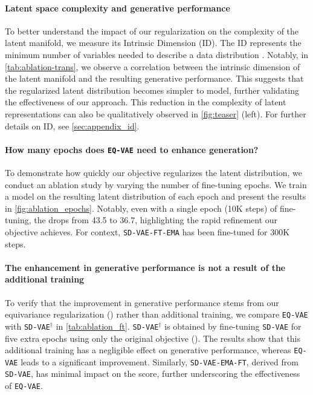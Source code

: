 


\vspace{-10pt}
\paragraph{Latent space complexity and generative performance}

To better understand the impact of our regularization on the complexity of the latent manifold, we measure its Intrinsic Dimension (ID). The ID represents the minimum number of variables needed to describe a data distribution \cite{1054365}. 
Notably, in \autoref{tab:ablation-trans}, we observe a correlation between the intrinsic dimension of the latent manifold and the resulting generative performance.
This suggests that the regularized latent distribution becomes simpler to model, further validating the effectiveness of our approach. This reduction in the complexity of latent representations can also be qualitatively observed in \autoref{fig:teaser} (left).
For further details on ID, see \autoref{sec:appendix_id}. 



\paragraph{How many epochs does \texttt{EQ-VAE} need to enhance generation?} To demonstrate how quickly our objective regularizes the latent distribution, we conduct an ablation study by varying the number of fine-tuning epochs. We train a \ditbtwo model on the resulting latent distribution of each epoch and present the results in \autoref{fig:ablation_epochs}. Notably, even with a single epoch (10K steps) of fine-tuning, the  drops from 43.5 to 36.7, highlighting the rapid refinement our objective achieves. For context, \texttt{SD-VAE-FT-EMA} has been fine-tuned for 300K steps.



\paragraph{The enhancement in generative performance is not a result of the additional training} 
To verify that the improvement in generative performance stems from our equivariance regularization () rather than additional training, we compare \texttt{EQ-VAE} with \texttt{SD-VAE}$^\dagger$ in \autoref{tab:ablation_ft}. \texttt{SD-VAE}$^\dagger$ is obtained by fine-tuning \texttt{SD-VAE} for five extra epochs using only the original objective (). The results show that this additional training has a negligible effect on generative performance, whereas \texttt{EQ-VAE} leads to a significant improvement. Similarly, \texttt{SD-VAE-EMA-FT}, derived from \texttt{SD-VAE}, has minimal impact on the  score, further underscoring the effectiveness of \texttt{EQ-VAE}.



